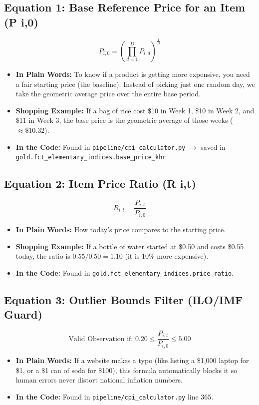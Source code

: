 \documentclass[11pt,a4paper,oneside]{article}
\begin{document}
\subsection{Equation 1: Base Reference Price for an Item (P {i,0})}
\begin{equation}
P_{i, 0} = \left( \prod_{d=1}^{D} P_{i, d} \right)^{\frac{1}{D}}
\end{equation}
\begin{itemize}
    \item \textbf{In Plain Words:} To know if a product is getting more expensive, you need a fair starting price (the baseline). Instead of picking just one random day, we take the geometric average price over the entire base period.
    \item \textbf{Shopping Example:} If a bag of rice cost \$10 in Week 1, \$10 in Week 2, and \$11 in Week 3, the base price is the geometric average of those weeks ($\approx \$10.32$).
    \item \textbf{In the Code:} Found in \texttt{pipeline/cpi\_calculator.py} $\rightarrow$ saved in \texttt{gold.fct\_elementary\_indices.base\_price\_khr}.
\end{itemize}

\subsection{Equation 2: Item Price Ratio (R {i,t})}
\begin{equation}
R_{i, t} = \frac{P_{i, t}}{P_{i, 0}}
\end{equation}
\begin{itemize}
    \item \textbf{In Plain Words:} How today's price compares to the starting price.
    \item \textbf{Shopping Example:} If a bottle of water started at \$0.50 and costs \$0.55 today, the ratio is $0.55 / 0.50 = \mathbf{1.10}$ (it is 10\% more expensive).
    \item \textbf{In the Code:} Found in \texttt{gold.fct\_elementary\_indices.price\_ratio}.
\end{itemize}

\subsection{Equation 3: Outlier Bounds Filter (ILO/IMF Guard)}
\begin{equation}
\text{Valid Observation if: } 0.20 \le \frac{P_{i, t}}{P_{i, 0}} \le 5.00
\end{equation}
\begin{itemize}
    \item \textbf{In Plain Words:} If a website makes a typo (like listing a \$1,000 laptop for \$1, or a \$1 can of soda for \$100), this formula automatically blocks it so human errors never distort national inflation numbers.
    \item \textbf{In the Code:} Found in \texttt{pipeline/cpi\_calculator.py} line 365.
\end{itemize}
\end{document}
